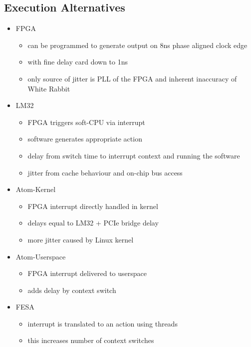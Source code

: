 \documentclass[25pt,halfparskip-,pagesize]{scrartcl}
\begin{document}
\begin{multicols*}{3}
\section{Execution Alternatives}
\begin{itemize}
  \item FPGA
    \begin{itemize}
      \item can be programmed to generate output on 8ns phase aligned clock edge
      \item with fine delay card down to 1ns
      \item only source of jitter is PLL of the FPGA and inherent inaccuracy of White Rabbit
    \end{itemize}
  \item LM32
    \begin{itemize}
      \item FPGA triggers soft-CPU via interrupt
      \item software generates appropriate action
      \item delay from switch time to interrupt context and running the software
      \item jitter from cache behaviour and on-chip bus access
    \end{itemize}
  \item Atom-Kernel
    \begin{itemize}
      \item FPGA interrupt directly handled in kernel
      \item delays equal to LM32 + PCIe bridge delay
      \item more jitter caused by Linux kernel
    \end{itemize}
  \item Atom-Userspace
    \begin{itemize}
      \item FPGA interrupt delivered to userspace
      \item adds delay by context switch 
    \end{itemize}
  \item FESA
    \begin{itemize}
      \item interrupt is translated to an action using threads
      \item this increases number of context switches
    \end{itemize}
\end{itemize}


\end{multicols*}
\end{document}
